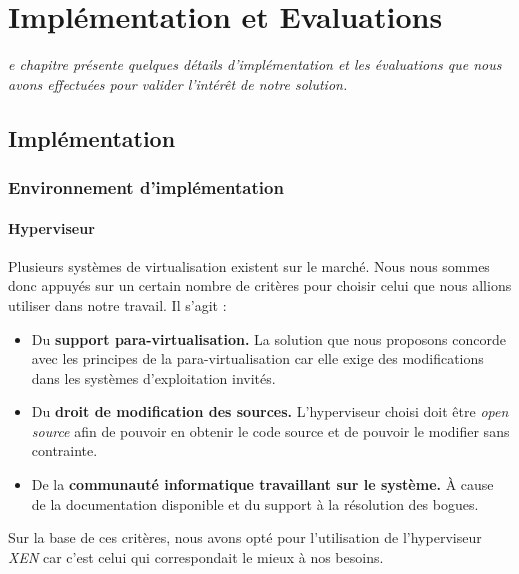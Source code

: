 \let\textcircled=\pgftextcircled
\chapter{Implémentation et Evaluations}
\label{chap:implem_eval}

\textit{e chapitre présente quelques détails d’implémentation et les évaluations que nous avons effectuées pour valider l’intérêt de notre solution.}

\minitoc

\newpage  
\section{Implémentation}
\subsection{Environnement d'implémentation}

\subsubsection{Hyperviseur}

Plusieurs systèmes de virtualisation existent sur le marché. Nous nous sommes donc appuyés sur un certain nombre de critères pour choisir celui que nous allions utiliser dans notre travail. Il s'agit :
\begin{itemize}[label=]
    \item Du \textbf{support para-virtualisation.} La solution que nous proposons concorde avec les principes de la para-virtualisation car elle exige des modifications dans les systèmes d'exploitation invités.
    \item Du \textbf{droit de modification des sources.} L'hyperviseur choisi doit être \textit{open source} afin de pouvoir en obtenir le code source et de pouvoir le modifier sans contrainte.
    \item De la \textbf{communauté informatique travaillant sur le système.} À cause de la documentation disponible et du support à la résolution des bogues.
\end{itemize}
\noindent Sur la base de ces critères, nous avons opté pour l'utilisation de l'hyperviseur \emph{XEN} \cite{article2} car c'est celui qui correspondait le mieux à nos besoins.

